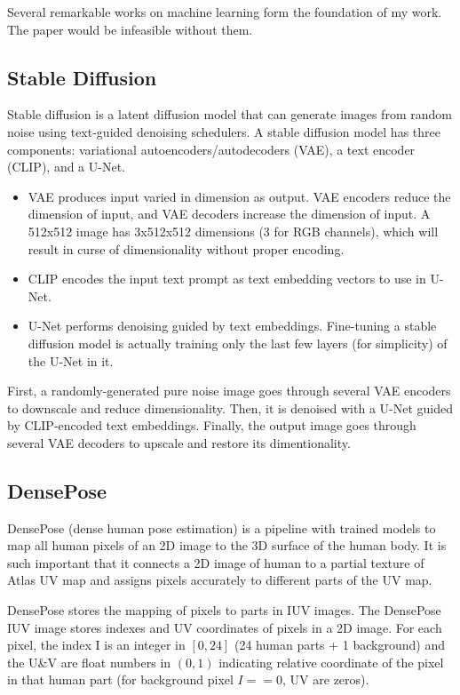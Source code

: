 \documentclass[acmtog]{acmart}
\begin{document}
Several remarkable works on machine learning form the foundation of my work. The paper would be infeasible without them.

\subsection{Stable Diffusion}

Stable diffusion is a latent diffusion model that can generate images from random noise using text-guided denoising schedulers. A stable diffusion model has three components: variational autoencoders/autodecoders (VAE), a text encoder (CLIP), and a U-Net.

\begin{itemize}
  \item VAE produces input varied in dimension as output. VAE encoders reduce the dimension of input, and VAE decoders increase the dimension of input. A 512x512 image has 3x512x512 dimensions (3 for RGB channels), which will result in curse of dimensionality without proper encoding.
  \item CLIP encodes the input text prompt as text embedding vectors to use in U-Net.
  \item U-Net performs denoising guided by text embeddings. Fine-tuning a stable diffusion model is actually training only the last few layers (for simplicity) of the U-Net in it.
\end{itemize}

First, a randomly-generated pure noise image goes through several VAE encoders to downscale and reduce dimensionality. Then, it is denoised with a U-Net guided by CLIP-encoded text embeddings. Finally, the output image goes through several VAE decoders to upscale and restore its dimentionality.

\subsection{DensePose}

DensePose (dense human pose estimation) \cite{guler2018densepose} is a pipeline with trained models to map all human pixels of an 2D image to the 3D surface of the human body. It is such important that it connects a 2D image of human to a partial texture of Atlas UV map and assigns pixels accurately to different parts of the UV map.

DensePose stores the mapping of pixels to parts in IUV images. The DensePose IUV image stores indexes and UV coordinates of pixels in a 2D image. For each pixel, the index I is an integer in \([0,24]\) (24 human parts + 1 background) and the U\&V are float numbers in \((0,1)\) indicating relative coordinate of the pixel in that human part (for background pixel \(I==0\), UV are zeros).
\end{document}
